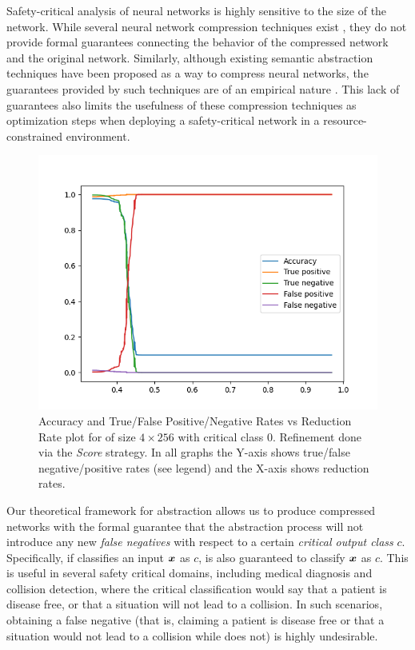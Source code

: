 Safety-critical analysis of neural networks is highly sensitive to the size of
the network. While several neural network compression techniques exist 
\cite{dnn-compression}, they do not provide formal guarantees 
connecting the behavior of the compressed network and the original network.
Similarly, although existing semantic abstraction techniques have been proposed
as a way to compress neural networks, the guarantees provided by such 
techniques are of an empirical nature \cite{lin-comb-abs-jan}.
This lack of guarantees also limits the usefulness of these compression
techniques as optimization steps when deploying a safety-critical network in a
resource-constrained environment. 

\begin{figure}
    \vspace*{-1cm}
    \includegraphics[scale=0.4]{figs/mnist-compr-4-256-samples.png}
    \caption{Accuracy and True/False Positive/Negative Rates vs Reduction Rate
        plot for \mnist of size $4 \times 256$ with critical class 0. Refinement
    done via the \emph{Score} strategy. In all graphs the Y-axis shows
    true/false negative/positive rates (see legend) and the X-axis shows
    reduction rates.   }
    \label{f:mnist-class}
    \vspace*{-1cm}
\end{figure}

Our theoretical framework for abstraction allows us to produce compressed
networks with the formal guarantee that the abstraction process will not
introduce any new \emph{false negatives} with respect to a certain
\emph{critical output class} $c$. Specifically, if \cnc classifies an input
$\boldsymbol{x}$ as $c$, \abs is also guaranteed to classify $\boldsymbol{x}$ as $c$. This is
useful in several safety critical domains, including medical diagnosis and
collision detection, where the critical classification would say that a patient
is disease free, or that a situation will not lead to a collision. In such
scenarios, obtaining a false negative (that is, \abs claiming a
patient is disease free or that a situation would not lead to a collision while
\cnc does not) is highly undesirable. 

